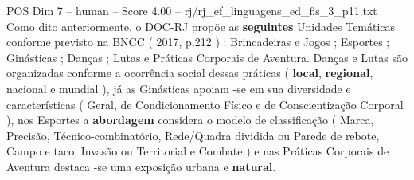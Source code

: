 \begin{textsample}{POS Dim 7 – human – Score 4.00 – rj/rj\_ef\_linguagens\_ed\_fis\_3\_p11.txt}  \label{ex:f7_pos_009}
Como dito anteriormente, o DOC-RJ propõe as \textbf{seguintes} Unidades Temáticas conforme previsto na BNCC ( 2017, p.212 ) : Brincadeiras e Jogos ; Esportes ; Ginásticas ; Danças ; Lutas e Práticas Corporais de Aventura.
Danças e Lutas são organizadas conforme a ocorrência social dessas práticas ( \textbf{local}, \textbf{regional}, nacional e mundial ), já as Ginásticas apoiam -se em sua diversidade e características ( Geral, de Condicionamento Físico e de Conscientização Corporal ), nos Esportes a \textbf{abordagem} considera o modelo de classificação ( Marca, Precisão, Técnico-combinatório, Rede/Quadra dividida ou Parede de rebote, Campo e taco, Invasão ou Territorial e Combate ) e nas Práticas Corporais de Aventura destaca -se uma exposição urbana e \textbf{natural}.

\end{textsample}
